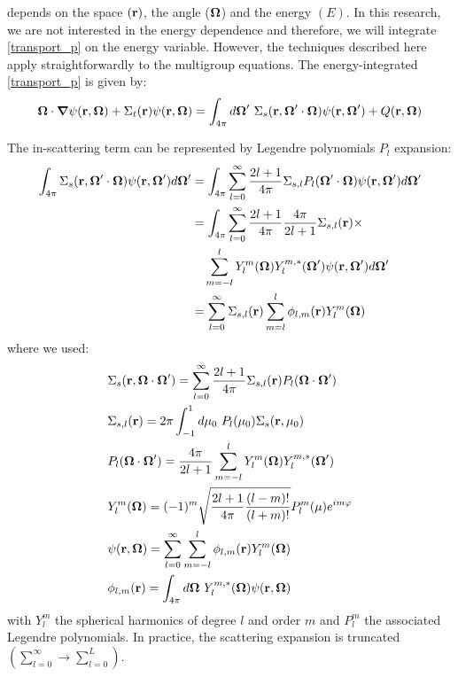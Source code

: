  depends on the space $(\mathbf{r})$, the angle ($\boldsymbol{\Omega}$) and the
energy $(E)$. In this research, we are not interested in the energy dependence 
and therefore, we will integrate \cref{transport_p} on the energy variable. 
However, the techniques described here apply straightforwardly to the multigroup 
equations. The energy-integrated \cref{transport_p} is given by:
\begin{equation}
\bo\cdot \bn \psi(\br,\bo) + \Sigma_t(\br)\psi(\br,\bo) =
\int_{4\pi}d\bo'\ \Sigma_s(\br,\bo'\cdot\bo)\psi(\br,\bo')+Q(\br,\bo)
\label{transport_p2}
\end{equation}

The in-scattering term can be represented by Legendre polynomials $P_l$ expansion:
\begin{equation}
\begin{split}
\int_{4\pi} \Sigma_s(\mathbf{r},\boldsymbol{\Omega}'\cdot\boldsymbol{\Omega}) \psi(\mathbf{r},\boldsymbol{\Omega}') d\boldsymbol{\Omega}' &=
\int_{4\pi} \sum_{l=0}^{\infty} \frac{2l+1}{4\pi} \Sigma_{s,l} P_l(\boldsymbol{\Omega}'\cdot\boldsymbol{\Omega})
\psi(\mathbf{r},\boldsymbol{\Omega}') d\boldsymbol{\Omega}'\\
&= \int_{4\pi} \sum_{l=0}^{\infty} \frac{2l+1}{4\pi}\frac{4\pi}{2l+1}
\Sigma_{s,l}(\mathbf{r}) \times\\
&\quad \sum_{m=-l}^{l} Y_l^m(\boldsymbol{\Omega})Y_l^{m,*}(\boldsymbol{\Omega}') \psi(\mathbf{r},\boldsymbol{\Omega}')d\boldsymbol{\Omega}'\\
&= \sum_{l=0}^{\infty} \Sigma_{s,l}(\mathbf{r}) \sum_{m=l}^l \phi_{l,m}(\mathbf{r})
Y_l^m(\boldsymbol{\Omega})
\end{split}
\end{equation}
where we used:
\begin{align}
&\Sigma_s(\br,\bo\cdot\bo') = \sum_{l=0}^{\infty} \frac{2l+1}{4\pi}
\Sigma_{s,l}(\br) P_l(\bo\cdot\bo')\\
&\Sigma_{s,l}(\br) = 2\pi \int_{-1}^1 d\mu_0\ P_l(\mu_0) \Sigma_s(\br,\mu_0)\\
& P_l(\bo\cdot\bo') = \frac{4\pi}{2l+1} \sum_{m=-l}^l
Y_l^m(\bo)Y_l^{m,*}(\bo')\\
& Y_l^m(\bo) = (-1)^m \sqrt{\frac{2l+1}{4\pi} \frac{(l-m)!}{(l+m)!}} P_l^m(\mu)
e^{im\varphi}\\
&\psi(\br,\bo) = \sum_{l=0}^{\infty}\sum_{m=-l}^l \phi_{l,m}(\br) Y_l^m(\bo)
\label{ang_flux}\\
&\phi_{l,m}(\br) = \int_{4\pi} d\bo\ Y_{l}^{m,*}(\bo) \psi(\br,\bo)
\label{moments}
\end{align}
with $Y_l^m$ the spherical harmonics of degree $l$ and order $m$ and $P_l^m$ 
the associated Legendre polynomials. In practice, the scattering expansion is 
truncated $(\sum_{l=0}^{\infty}\rightarrow \sum_{l=0}^L)$.\\
